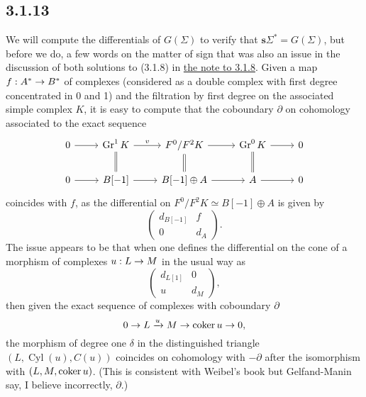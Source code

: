 \documentclass[deligne.tex]{subfiles}
\begin{document}
\subsection*{3.1.13} We will compute the differentials of $G(\Sigma)$ to
verify that $\mathbf s\Sigma^*=G(\Sigma)$, but before we do, a few words
on the matter of sign that was also an issue in the discussion of both
solutions to (3.1.8) in \hyperref[BBD:3.1.8]{the note to 3.1.8}.
Given a map $f:A^*\rightarrow B^*$ of complexes (considered as a double complex
with first degree concentrated in 0 and 1) and the filtration by first
degree on the associated simple complex $K$, it is easy to compute that the
coboundary $\partial$ on cohomology associated to the exact sequence
\begin{equation*}\begin{tikzcd}
	0\arrow[r]&\Gr^{1}K\arrow[d,equals]\arrow[r,"v"]
	&F^0/F^{2}K\arrow[d,equals]\arrow[r]&\Gr^0K\arrow[d,equals]\arrow[r]&0\\
	0\arrow[r]&B[-1]\arrow[r]&B[-1]\oplus A\arrow[r]&A\arrow[r]&0
\end{tikzcd}\end{equation*}
coincides with $f$, as the differential on $F^0/F^2K\simeq B[-1]\oplus A$
is given by
\begin{equation*}
	\begin{pmatrix}d_{B[-1]}&f\\0&d_A\end{pmatrix}.
\end{equation*}
The issue appears to be that when one defines the differential on the cone 
of a morphism of complexes $u:L\rightarrow M$ in the usual way as
\begin{equation*}
	\begin{pmatrix}d_{L[1]}&0\\u&d_M\end{pmatrix},
\end{equation*}
then given the exact sequence of complexes with coboundary $\partial$
\begin{equation*}
	0\rightarrow L\xrightarrow u M\rightarrow\operatorname{coker} u\rightarrow 0,
\end{equation*}
the morphism of degree one $\delta$ in the distinguished triangle
$(L,\operatorname{Cyl}(u),C(u))$ coincides on cohomology with $-\partial$
after the isomorphism with $(L,M,\operatorname{coker} u)$.
(This is consistent with Weibel's book but Gelfand-Manin say, I believe
incorrectly, $\partial$.)
\end{document}
